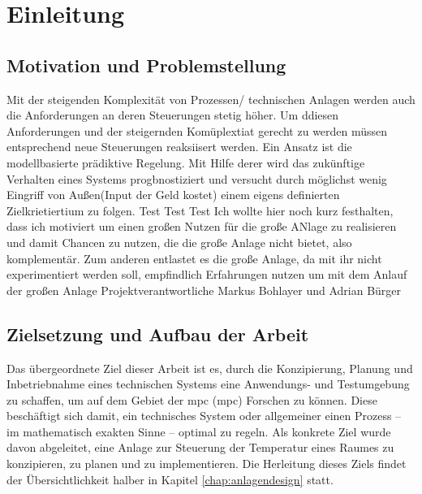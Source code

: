 %
%

\renewcommand{\chapterheadstartvskip}{\vspace*{2cm}}
\chapter{Einleitung}
\label{chap:einleitung}
\setcounter{page}{1}
\renewcommand{\chapterheadstartvskip}{\vspace*{-1cm}}


\section{Motivation und Problemstellung}
\label{sec:motivation}
Mit der steigenden Komplexität von Prozessen/ technischen Anlagen werden auch die Anforderungen an deren Steuerungen stetig höher. Um ddiesen Anforderungen und der steigernden Komüplextiat gerecht zu werden müssen entsprechend neue Steuerungen reaksiisert werden. Ein Ansatz ist die modellbasierte prädiktive Regelung. Mit Hilfe derer wird das zukünftige Verhalten eines Systems progbnostiziert und versucht durch möglichst wenig Eingriff von Außen(Input der Geld kostet) einem eigens definierten Zielkrietiertium zu folgen.
Test Test Test
Ich wollte hier noch kurz festhalten, dass ich motiviert um einen großen Nutzen für die große ANlage zu realisieren und damit Chancen zu nutzen, die die große Anlage nicht bietet, also komplementär.
Zum anderen entlastet es die große Anlage, da mit ihr nicht experimentiert werden soll, empfindlich
Erfahrungen nutzen um mit dem Anlauf der großen Anlage 
Projektverantwortliche Markus Bohlayer und Adrian Bürger

\section{Zielsetzung und Aufbau der Arbeit}
\label{sec:ziel}
Das übergeordnete Ziel dieser Arbeit ist es, durch die Konzipierung, Planung und Inbetriebnahme eines technischen Systems eine Anwendungs- und Testumgebung zu schaffen, um auf dem Gebiet der \acrlong{mpc} (\acrshort{mpc}) Forschen zu können.
Diese beschäftigt sich damit, ein technisches System oder allgemeiner einen Prozess -- im mathematisch exakten Sinne -- optimal zu regeln.
Als konkrete Ziel wurde davon abgeleitet, eine Anlage zur Steuerung der Temperatur eines Raumes zu konzipieren, zu planen und zu implementieren. 
Die Herleitung dieses Ziels findet der Übersichtlichkeit halber in Kapitel \ref{chap:anlagendesign} statt.


